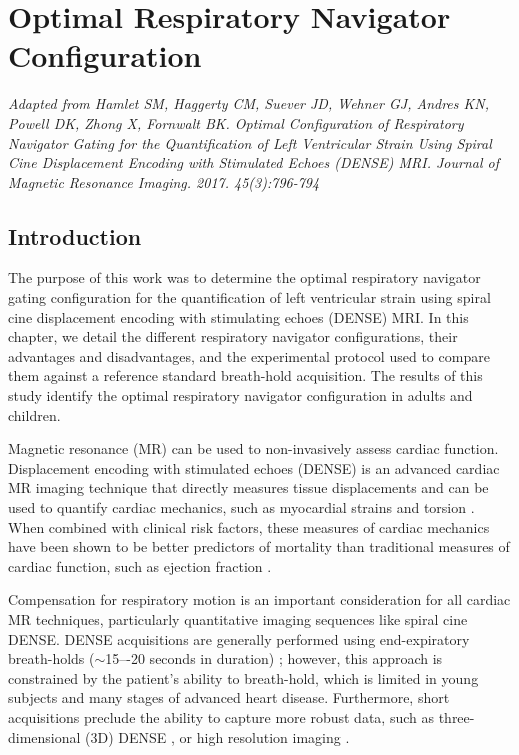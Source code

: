 \chapter{Optimal Respiratory Navigator Configuration}

\begin{center}
	\textit{Adapted from Hamlet SM, Haggerty CM, Suever JD, Wehner GJ, Andres KN, Powell DK, Zhong X, Fornwalt BK. Optimal Configuration of Respiratory Navigator Gating for the Quantification of Left Ventricular Strain Using Spiral Cine Displacement Encoding with Stimulated Echoes (DENSE) MRI. Journal of Magnetic Resonance Imaging. 2017. 45(3):796-794} \cite{Hamlet2016}
\end{center}

\section{Introduction}
	The purpose of this work was to determine the optimal respiratory navigator gating configuration for the quantification of left ventricular strain using spiral cine displacement encoding with stimulating echoes (DENSE) MRI.  In this chapter, we detail the different respiratory navigator configurations, their advantages and disadvantages, and the experimental protocol used to compare them against a reference standard breath-hold acquisition. The results of this study identify the optimal respiratory navigator configuration in adults and children.
	
	Magnetic resonance (MR) can be used to non-invasively assess cardiac function. Displacement encoding with stimulated echoes (DENSE) is an advanced cardiac MR imaging technique that directly measures tissue displacements and can be used to quantify cardiac mechanics, such as myocardial strains and torsion \cite{Aletras1999b,Aletras1999c}. When combined with clinical risk factors, these measures of cardiac mechanics have been shown to be better predictors of mortality than traditional measures of cardiac function, such as ejection fraction \cite{Stanton2009}.
	 
	Compensation for respiratory motion is an important consideration for all cardiac MR techniques, particularly quantitative imaging sequences like spiral cine DENSE. DENSE acquisitions are generally performed using end-expiratory breath-holds ($\sim$15–-20 seconds in duration) \cite{Kim2004,Zhong2006a,Ernande2012,Zhong2010a,Aletras2005,Spottiswoode2007,Young2012c}; however, this approach is constrained by the patient's ability to breath-hold, which is limited in young subjects and many stages of advanced heart disease. Furthermore, short acquisitions preclude the ability to capture more robust data, such as three-dimensional (3D) DENSE \cite{Zhong2010a,Kar2014,Auger2012}, or high resolution imaging \cite{Wehner2014}.
	

